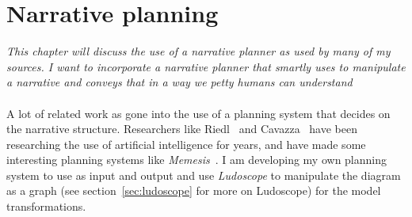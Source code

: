 \chapter{Narrative planning}
\textit{This chapter will discuss the use of a narrative planner as used by many of my sources. I want to incorporate a narrative planner that smartly uses \diage to manipulate a narrative and conveys that in a way we petty humans can understand}
\\\\
A lot of related work as gone into the use of a planning system that decides on the narrative structure. Researchers like Riedl~\cite{Riedl03character-focusednarrative}\cite{Riedl:2003:MIU:860575.860694}\cite{Riedl:2004:IPM:1018409.1018753} and Cavazza~\cite{Cavazza:2002:CIS:630325.630747} have been researching the use of artificial intelligence for years, and have made some interesting planning systems like \textit{Memesis}~\citationneeded. I am developing my own planning system to use \diage as input and output and use \textit{Ludoscope} to manipulate the diagram as a graph (see section~\ref{sec:ludoscope} for more on Ludoscope) for the model transformations. 